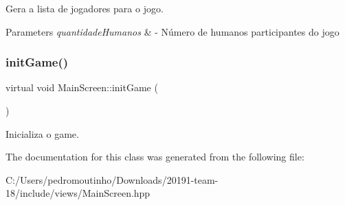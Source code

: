 Gera a lista de jogadores para o jogo. 


\begin{DoxyParams}{Parameters}
{\em quantidade\+Humanos} & -\/ Número de humanos participantes do jogo \\
\hline
\end{DoxyParams}
\mbox{\label{class_main_screen_a26e54b5922d5ffec7483309a14d0f55a}} 
\subsubsection{\texorpdfstring{initGame()}{initGame()}}
{\footnotesize\ttfamily virtual void Main\+Screen\+::init\+Game (\begin{DoxyParamCaption}{ }\end{DoxyParamCaption})\hspace{0.3cm}{\ttfamily [virtual]}}



Inicializa o game. 



The documentation for this class was generated from the following file\+:\begin{DoxyCompactItemize}
\item 
C\+:/\+Users/pedromoutinho/\+Downloads/20191-\/team-\/18/include/views/Main\+Screen.\+hpp\end{DoxyCompactItemize}
